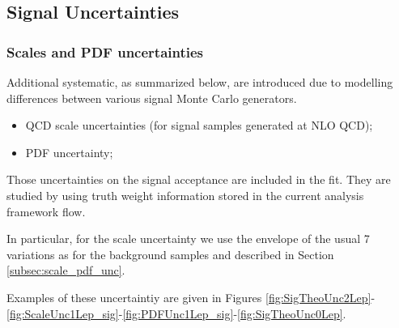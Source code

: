 \clearpage
\subsection{Signal Uncertainties}
\label{subsec:sig_uncer}


\subsubsection{Scales and PDF uncertainties}
\label{subsec:sig_uncer_scales_PDF}

Additional systematic, as summarized below, are introduced due to modelling differences between various signal Monte Carlo generators.

\begin{itemize}
        \item QCD scale uncertainties (for signal samples generated at NLO QCD);
        \item PDF uncertainty;
\end{itemize}

Those uncertainties on the signal acceptance are included in the fit. They are studied by using truth weight information stored in the current analysis framework flow.

%


In particular, for the scale uncertainty we use the envelope of the usual 7 variations as for the background samples and described in Section \ref{subsec:scale_pdf_unc}.

Examples of these uncertaintiy are given in Figures \ref{fig:SigTheoUnc2Lep}-\ref{fig:ScaleUnc1Lep_sig}-\ref{fig:PDFUnc1Lep_sig}-\ref{fig:SigTheoUnc0Lep}.

